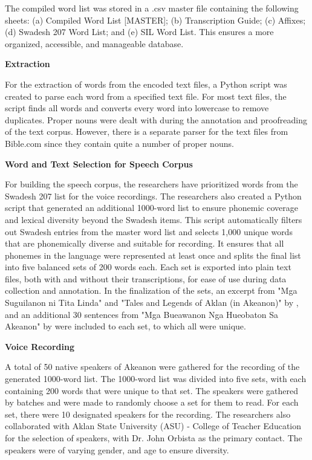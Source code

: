 The compiled word list was stored in a .csv master file containing the following sheets: (a) Compiled Word List [MASTER]; (b) Transcription Guide; (c) Affixes; (d) Swadesh 207 Word List; and (e) SIL Word List. This ensures a more organized, accessible, and manageable database.

\textbf{Extraction}

For the extraction of words from the encoded text files, a Python script was created to parse each word from a specified text file. For most text files, the script finds all words and converts every word into lowercase to remove duplicates. Proper nouns were dealt with during the annotation and proofreading of the text corpus. However, there is a separate parser for the text files from Bible.com since they contain quite a number of proper nouns.

\textbf{Word and Text Selection for Speech Corpus}

For building the speech corpus, the researchers have prioritized words from the Swadesh 207 list for the voice recordings. The researchers also created a Python script that generated an additional 1000-word list to ensure phonemic coverage and lexical diversity beyond the Swadesh items. This script automatically filters out Swadesh entries from the master word list and selects 1,000 unique words that are phonemically diverse and suitable for recording. It ensures that all phonemes in the language were represented at least once and splits the final list into five balanced sets of 200 words each. Each set is exported into plain text files, both with and without their transcriptions, for ease of use during data collection and annotation. In the finalization of the sets, an excerpt from "Mga Suguilanon ni Tita Linda" and "Tales and Legends of Aklan (in Akeanon)" by , and an additional 30 sentences from "Mga Bueawanon Nga Hueobaton Sa Akeanon" by  were included to each set, to which all were unique.

\textbf{Voice Recording}

A total of 50 native speakers of Akeanon were gathered for the recording of the generated 1000-word list. The 1000-word list was divided into five sets, with each containing 200 words that were unique to that set. The speakers were gathered by batches and were made to randomly choose a set for them to read. For each set, there were 10 designated speakers for the recording. The researchers also collaborated with Aklan State University (ASU) - College of Teacher Education for the selection of speakers, with Dr. John Orbista as the primary contact. The speakers were of varying gender, and age to ensure diversity.

